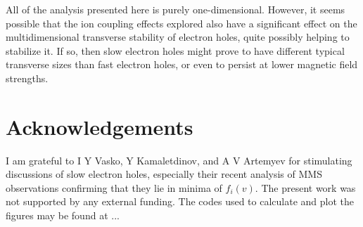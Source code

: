 \documentclass[12pt]{article}
\begin{document}
All of the analysis presented here is purely one-dimensional. However,
it seems possible that the ion coupling effects explored also have a
significant effect on the multidimensional transverse stability of
electron holes, quite possibly helping to stabilize it. If so, then
slow electron holes might prove to have different typical transverse
sizes than fast electron holes, or even to persist at lower magnetic
field strengths. 

\section*{Acknowledgements}

I am grateful to I Y Vasko, Y Kamaletdinov, and A V Artemyev for
stimulating discussions of slow electron holes, especially their
recent analysis of MMS observations confirming that they lie in minima
of $f_i(v)$. The present work was not supported by any external
funding. The codes used to calculate and plot the figures may be found
at ...


\end{document}
